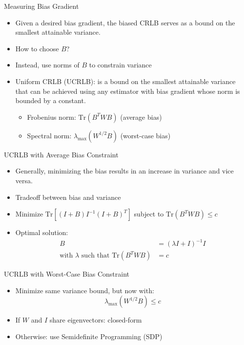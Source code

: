 \documentclass{beamer}
\begin{document}
\begin{frame}{Measuring Bias Gradient}
  \begin{itemize}
  \item Given a desired bias gradient, the biased CRLB serves as a bound on the smallest attainable variance.
  \item How to choose $B$?
  \item Instead, use norms of $B$ to constrain variance
  \item Uniform CRLB (UCRLB): is a bound on the smallest attainable
  variance that can be achieved using any estimator with bias gradient whose norm is bounded by a constant.
  \begin{itemize}
    \item Frobenius norm: $\mathrm{Tr}(B^T W B)$ (average bias)
    \item Spectral norm: $\lambda_{\max}(W^{1/2} B)$ (worst-case bias)
  \end{itemize}
  \end{itemize}
\end{frame}

\begin{frame}{UCRLB with Average Bias Constraint}
  \begin{itemize}
    \item Generally, minimizing the bias results in an increase in variance and vice versa.
    \item Tradeoff between bias and variance
    \item Minimize $\mathrm{Tr}[(I + B) I^{-1} (I + B)^T]$ subject to $\mathrm{Tr}(B^T W B) \leq c$
    \item Optimal solution:
    \begin{align*}
      B &= (\lambda I + I)^{-1} I \\
      \text{with } \lambda \text{ such that } \mathrm{Tr}(B^T W B) &= c
    \end{align*}
  \end{itemize}
\end{frame}

\begin{frame}{UCRLB with Worst-Case Bias Constraint}
  \begin{itemize}
    \item Minimize same variance bound, but now with:
    \[
    \lambda_{\max}(W^{1/2} B) \leq c
    \]
    \item If $W$ and $I$ share eigenvectors: closed-form
    \item Otherwise: use Semidefinite Programming (SDP)
  \end{itemize}
\end{frame}
\end{document}
